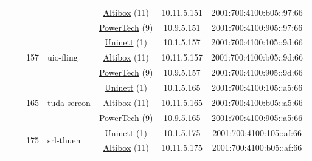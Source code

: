 \begin{small}
\begin{center}
\begin{longtable}{|c|c|c|c|c|c|c|c|}
  &  &  &  & \multicolumn{2}{|c|}{\tiny{\href{https://www.altibox.no}{Altibox} (11)}} & \tiny{10.11.5.151} & \tiny{2001:700:4100:b05::97:66} \\* \cline{5-5}\cline{6-6}\cline{7-7}\cline{8-8}
  &  &  &  & \multicolumn{2}{|c|}{\tiny{\href{http://www.powertech.no}{PowerTech} (9)}} & \tiny{10.9.5.151} & \tiny{2001:700:4100:905::97:66} \\* \cline{3-3}\cline{4-4}\cline{5-5}\cline{6-6}\cline{7-7}\cline{8-8}
  &  & \multirow{3}{*}{\tiny{157}} & \multicolumn{1}{|l|}{\multirow{3}{*}{\tiny{uio-fling}}} & \multicolumn{2}{|c|}{\tiny{\href{https://www.uninett.no}{Uninett} (1)}} & \tiny{10.1.5.157} & \tiny{2001:700:4100:105::9d:66} \\* \cline{5-5}\cline{6-6}\cline{7-7}\cline{8-8}
  &  &  &  & \multicolumn{2}{|c|}{\tiny{\href{https://www.altibox.no}{Altibox} (11)}} & \tiny{10.11.5.157} & \tiny{2001:700:4100:b05::9d:66} \\* \cline{5-5}\cline{6-6}\cline{7-7}\cline{8-8}
  &  &  &  & \multicolumn{2}{|c|}{\tiny{\href{http://www.powertech.no}{PowerTech} (9)}} & \tiny{10.9.5.157} & \tiny{2001:700:4100:905::9d:66} \\* \cline{3-3}\cline{4-4}\cline{5-5}\cline{6-6}\cline{7-7}\cline{8-8}
  &  & \multirow{3}{*}{\tiny{165}} & \multicolumn{1}{|l|}{\multirow{3}{*}{\tiny{tuda-sereon}}} & \multicolumn{2}{|c|}{\tiny{\href{https://www.uninett.no}{Uninett} (1)}} & \tiny{10.1.5.165} & \tiny{2001:700:4100:105::a5:66} \\* \cline{5-5}\cline{6-6}\cline{7-7}\cline{8-8}
  &  &  &  & \multicolumn{2}{|c|}{\tiny{\href{https://www.altibox.no}{Altibox} (11)}} & \tiny{10.11.5.165} & \tiny{2001:700:4100:b05::a5:66} \\* \cline{5-5}\cline{6-6}\cline{7-7}\cline{8-8}
  &  &  &  & \multicolumn{2}{|c|}{\tiny{\href{http://www.powertech.no}{PowerTech} (9)}} & \tiny{10.9.5.165} & \tiny{2001:700:4100:905::a5:66} \\* \cline{3-3}\cline{4-4}\cline{5-5}\cline{6-6}\cline{7-7}\cline{8-8}
  &  & \multirow{3}{*}{\tiny{175}} & \multicolumn{1}{|l|}{\multirow{3}{*}{\tiny{srl-thuen}}} & \multicolumn{2}{|c|}{\tiny{\href{https://www.uninett.no}{Uninett} (1)}} & \tiny{10.1.5.175} & \tiny{2001:700:4100:105::af:66} \\* \cline{5-5}\cline{6-6}\cline{7-7}\cline{8-8}
  &  &  &  & \multicolumn{2}{|c|}{\tiny{\href{https://www.altibox.no}{Altibox} (11)}} & \tiny{10.11.5.175} & \tiny{2001:700:4100:b05::af:66} \\* \cline{5-5}\cline{6-6}\cline{7-7}\cline{8-8}

\end{longtable}
\end{center}
\end{small}
